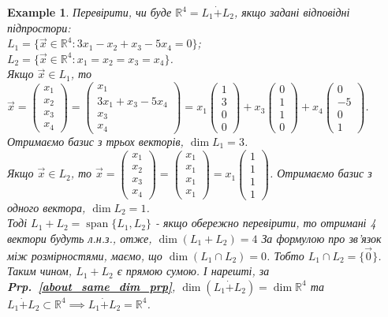 \documentclass[a4paper, 10pt]{article}
\theoremstyle{theoremdd}
\newtheorem{example}[theorem]{Example}
\newcommand\prpref[1]{\textbf{Prp.~\ref{#1}}}
\DeclareMathOperator{\linspan}{span}
\begin{document}
	\begin{example}
	Перевірити, чи буде $\mathbb{R}^4 = L_1 \dot{+} L_2$, якщо задані відповідні підпростори:\\
	$L_1 = \{\vec{x} \in \mathbb{R}^4: 3x_1 - x_2 + x_3 - 5x_4 = 0\}$;\\
	$L_2 = \{\vec{x} \in \mathbb{R}^4: x_1 = x_2 = x_3 = x_4\}$.\\
	Якщо $\vec{x} \in L_1$, то $\vec{x} = \begin{pmatrix} x_1 \\ x_2 \\ x_3 \\ x_4 \end{pmatrix} = \begin{pmatrix}
	x_1 \\ 3x_1+x_3-5x_4 \\ x_3 \\ x_4
	\end{pmatrix} = x_1 \begin{pmatrix}
	1 \\ 3 \\ 0 \\ 0
	\end{pmatrix} + x_3\begin{pmatrix}
	0 \\ 1 \\ 1 \\ 0
	\end{pmatrix} +  x_4\begin{pmatrix}
	0 \\ -5 \\ 0 \\ 1
	\end{pmatrix}$. Отримаємо базис з трьох векторів, $\dim L_1 = 3$.\\
	Якщо $\vec{x} \in L_2$, то $\vec{x} = \begin{pmatrix} x_1 \\ x_2 \\ x_3 \\ x_4 \end{pmatrix} = \begin{pmatrix} x_1 \\ x_1 \\ x_1 \\ x_1 \end{pmatrix} = x_1 \begin{pmatrix} 1 \\ 1 \\ 1 \\ 1 \end{pmatrix}$. Отримаємо базис з одного вектора, $\dim L_2 = 1$.\\
	Тоді $L_1 + L_2 = \linspan\{L_1,L_2\}$ - якщо обережно перевірити, то отримані 4 вектори будуть л.н.з., отже, $\dim (L_1 + L_2) = 4$ За формулою про зв'язок між розмірностями, маємо, що $\dim{(L_1 \cap L_2)} = 0$. Тобто $L_1 \cap L_2 = \{ \vec{0} \}$.\\
	Таким чином, $L_1 + L_2$ є прямою сумою. І нарешті, за \prpref{about_same_dim_prp}, $\dim{(L_1 \dot{+} L_2)} = \dim {\mathbb{R}^4}$ та \\ $L_1 \dot{+} L_2 \subset \mathbb{R}^4 \implies L_1 \dot{+} L_2 = \mathbb{R}^4$.
	\end{example}
	
\end{document}
